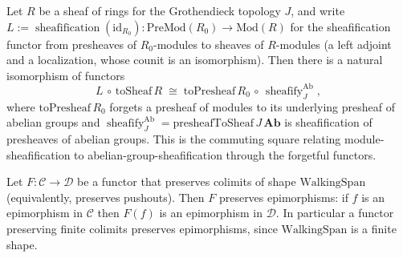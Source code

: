 \begin{lemma}
  \label{mk-lem:sheafificationCompToSheaf_mathlib}
  \mathlibok

  Let \(R\) be a sheaf of rings for the Grothendieck topology \(J\), and write
  \(L := \operatorname{sheafification}(\mathrm{id}_{R_0})
  : \mathrm{PreMod}(R_0) \to \mathrm{Mod}(R)\) for the sheafification functor from presheaves of
  \(R_0\)-modules to sheaves of \(R\)-modules (a left adjoint and a localization, whose counit is an
  isomorphism). Then there is a natural isomorphism of functors
  \[
    L \,\circ\, \mathrm{toSheaf}\,R \;\cong\;
    \mathrm{toPresheaf}\,R_0 \,\circ\, \operatorname{sheafify}_J^{\mathrm{Ab}},
  \]
  where \(\mathrm{toPresheaf}\,R_0\) forgets a presheaf of modules to its underlying presheaf of
  abelian groups and \(\operatorname{sheafify}_J^{\mathrm{Ab}} = \mathrm{presheafToSheaf}\,J\,
  \mathbf{Ab}\) is sheafification of presheaves of abelian groups. This is the commuting square
  relating module-sheafification to abelian-group-sheafification through the forgetful functors.
\end{lemma}

\begin{lemma}
  \label{mk-lem:preservesEpi_of_preservesColimitsOfShape_mathlib}
  \mathlibok

  Let \(F : \mathcal{C} \to \mathcal{D}\) be a functor that preserves colimits of shape
  \(\mathrm{WalkingSpan}\) (equivalently, preserves pushouts). Then \(F\) preserves epimorphisms: if
  \(f\) is an epimorphism in \(\mathcal{C}\) then \(F(f)\) is an epimorphism in \(\mathcal{D}\). In
  particular a functor preserving finite colimits preserves epimorphisms, since
  \(\mathrm{WalkingSpan}\) is a finite shape.
\end{lemma}

